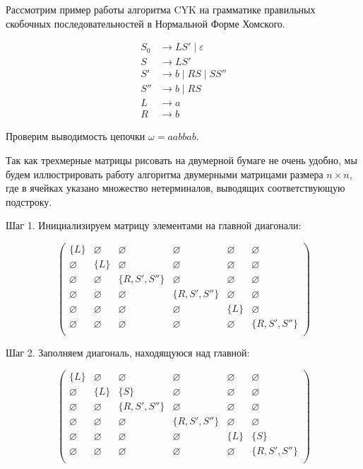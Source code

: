 \begin{example}
  Рассмотрим пример работы алгоритма CYK на грамматике правильных скобочных последовательностей в Нормальной Форме Хомского. 

\begin{align*}
S_0 &\to L S' \mid \varepsilon \\ 
S   &\to L S' \\ 
S'  &\to b \mid R S \mid S S'' \\ 
S'' &\to b \mid R S \\
L   &\to a \\ 
R   &\to b
\end{align*}
 
Проверим выводимость цепочки $\omega = a a b b a b$.

Так как трехмерные матрицы рисовать на двумерной бумаге не очень удобно, мы будем иллюстрировать работу алгоритма двумерными матрицами размера $n \times n$, где в ячейках указано множество нетерминалов, выводящих соответствующую подстроку. 

Шаг 1. Инициализируем матрицу элементами на главной диагонали: 

\[
\begin{pmatrix}
\{L\}  		& \varnothing & \varnothing    & \varnothing 	  & \varnothing & \varnothing 	 \\
\varnothing & \{L\} 	  & \varnothing    & \varnothing 	  & \varnothing & \varnothing 	 \\
\varnothing & \varnothing & \{R, S', S''\} & \varnothing 	  & \varnothing & \varnothing 	 \\
\varnothing & \varnothing & \varnothing    & \{R, S', S''\}   & \varnothing & \varnothing 	 \\
\varnothing & \varnothing & \varnothing    & \varnothing 	  & \{L\} 	    & \varnothing 	 \\
\varnothing & \varnothing & \varnothing    & \varnothing 	  & \varnothing & \{R, S', S''\} \\
\end{pmatrix}
\]

Шаг 2. Заполняем диагональ, находящуюся над главной:

\[
\begin{pmatrix}
\{L\}  		& \varnothing & \varnothing    & \varnothing 	  & \varnothing & \varnothing 	 \\
\varnothing & \{L\} 	  & \{S\}  		   & \varnothing 	  & \varnothing & \varnothing 	 \\
\varnothing & \varnothing & \{R, S', S''\} & \varnothing 	  & \varnothing & \varnothing 	 \\
\varnothing & \varnothing & \varnothing    & \{R, S', S''\}   & \varnothing & \varnothing 	 \\
\varnothing & \varnothing & \varnothing    & \varnothing 	  & \{L\} 	    & \{S\}	 		 \\
\varnothing & \varnothing & \varnothing    & \varnothing 	  & \varnothing & \{R, S', S''\} \\
\end{pmatrix}
\]


\end{example}
